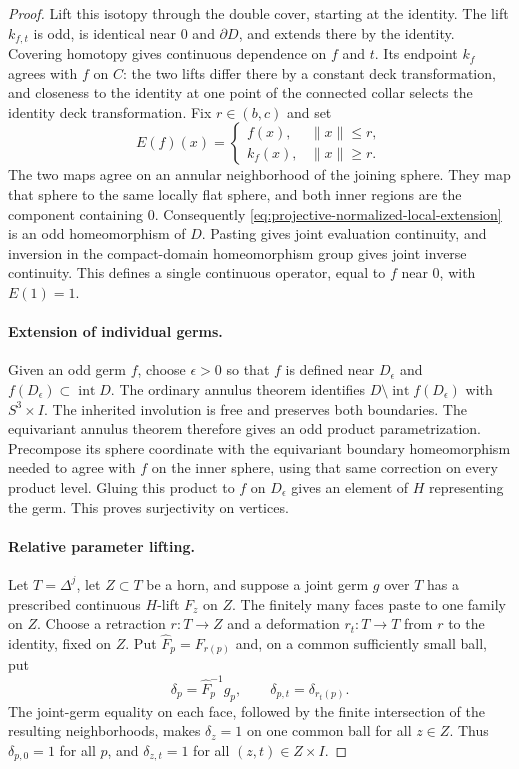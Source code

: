 \begin{proof}
Lift this isotopy through the double cover, starting at the
identity.  The lift $k_{f,t}$ is odd, is identical near $0$
and $\partial D$, and extends there by the identity.
Covering homotopy gives continuous dependence on $f$ and $t$.
Its endpoint $k_f$ agrees with $f$ on $C$: the two lifts
differ there by a constant deck transformation, and closeness
to the identity at one point of the connected collar selects
the identity deck transformation.  Fix $r\in(b,c)$ and set
\begin{equation}\label{eq:projective-normalized-local-extension}
 E(f)(x)=
 \begin{cases}
  f(x),&\|x\|\leq r,\\
  k_f(x),&\|x\|\geq r.
 \end{cases}
\end{equation}
The two maps agree on an annular neighborhood of the joining
sphere.  They map that sphere to the same locally flat sphere,
and both inner regions are the component containing $0$.
Consequently \eqref{eq:projective-normalized-local-extension}
is an odd homeomorphism of $D$.  Pasting gives joint evaluation
continuity, and inversion in the compact-domain homeomorphism
group gives joint inverse continuity.  This defines a single
continuous operator, equal to $f$ near $0$, with $E(1)=1$.

\paragraph{Extension of individual germs.}
Given an odd germ $f$, choose $\epsilon>0$ so that $f$ is
defined near $D_\epsilon$ and
$f(D_\epsilon)\subset\operatorname{int}D$.
The ordinary annulus theorem identifies
$D\setminus\operatorname{int}f(D_\epsilon)$ with $S^3\times I$.
The inherited involution is free and preserves both boundaries.
The equivariant annulus theorem therefore gives an odd product
parametrization.  Precompose its sphere coordinate with the
equivariant boundary homeomorphism needed to agree with $f$
on the inner sphere, using that same correction on every
product level.  Gluing this product to $f$ on $D_\epsilon$
gives an element of $H$ representing the germ.  This proves
surjectivity on vertices.

\paragraph{Relative parameter lifting.}
Let $T=\Delta^j$, let $Z\subset T$ be a horn, and suppose
a joint germ $g$ over $T$ has a prescribed continuous
$H$-lift $F_z$ on $Z$.  The finitely many faces paste to
one family on $Z$.  Choose a retraction $r:T\to Z$ and
a deformation $r_t:T\to T$ from $r$ to the identity,
fixed on $Z$.  Put $\widehat F_p=F_{r(p)}$ and, on a
common sufficiently small ball, put
\[
 \delta_p=\widehat F_p^{-1}g_p,\qquad
 \delta_{p,t}=\delta_{r_t(p)}.
\]
The joint-germ equality on each face, followed by the
finite intersection of the resulting neighborhoods, makes
$\delta_z=1$ on one common ball for all $z\in Z$.
Thus $\delta_{p,0}=1$ for all $p$, and
$\delta_{z,t}=1$ for all $(z,t)\in Z\times I$.


\end{proof}
